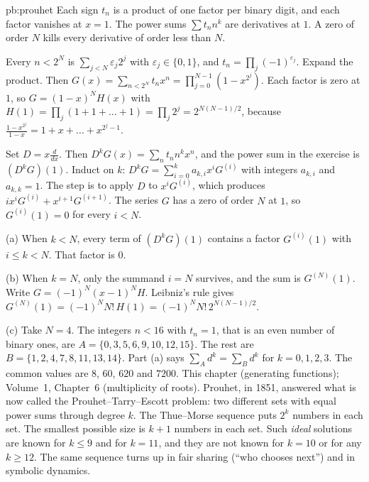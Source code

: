 \begin{solution}{pb:prouhet}
\idea Each sign $t_n$ is a product of one factor per binary digit, and each factor vanishes at $x=1$. The power sums $\sum t_nn^k$ are derivatives at $1$. A zero of order $N$ kills every
derivative of order less than $N$.

\writeup Every $n<2^N$ is $\sum_{j<N}\varepsilon_j2^j$ with $\varepsilon_j\in\{0,1\}$, and $t_n=\prod_j(-1)^{\varepsilon_j}$. Expand
the product. Then $G(x)=\sum_{n<2^N}t_nx^n=\prod_{j=0}^{N-1}(1-x^{2^j})$. Each factor is zero at $1$, so $G=(1-x)^NH(x)$ with
$H(1)=\prod_j(1+1+\dots+1)=\prod_j2^j=2^{N(N-1)/2}$, because $\frac{1-x^{2^j}}{1-x}=1+x+\dots+x^{2^j-1}$.

Set $D=x\frac d{dx}$. Then $D^kG(x)=\sum_nt_nn^kx^n$, and the power sum in the exercise is $(D^kG)(1)$. Induct on $k$:
$D^kG=\sum_{i=0}^ka_{k,i}x^iG^{(i)}$ with integers $a_{k,i}$ and $a_{k,k}=1$. The step is to apply $D$ to $x^iG^{(i)}$, which produces
$ix^iG^{(i)}+x^{i+1}G^{(i+1)}$. The series $G$ has a zero of order $N$ at $1$, so $G^{(i)}(1)=0$ for every $i<N$.

(a) When $k<N$, every term of $(D^kG)(1)$ contains a factor $G^{(i)}(1)$ with $i\le k<N$. That factor is $0$.

(b) When $k=N$, only the summand $i=N$ survives, and the sum is $G^{(N)}(1)$. Write $G=(-1)^N(x-1)^NH$. Leibniz's rule gives
$G^{(N)}(1)=(-1)^NN!\,H(1)=(-1)^NN!\,2^{N(N-1)/2}$.

(c) Take $N=4$. The integers $n<16$ with $t_n=1$, that is an even number of binary ones, are
$A=\{0,3,5,6,9,10,12,15\}$. The rest are $B=\{1,2,4,7,8,11,13,14\}$. Part (a) says $\sum_Ad^k=\sum_Bd^k$ for $k=0,1,2,3$.
The common values are $8$, $60$, $620$ and $7200$.
\tools This chapter (generating functions); Volume~1, Chapter~6 (multiplicity of roots).
\leads Prouhet, in 1851, answered what is now called the Prouhet--Tarry--Escott problem: two different sets
with equal power sums through degree $k$. The Thue--Morse sequence puts $2^{k}$ numbers in each set. The smallest possible size is
$k+1$ numbers in each set. Such \emph{ideal} solutions are known for $k\le9$ and for $k=11$, and they are not known for $k=10$ or for any $k\ge12$. The same sequence turns up in fair sharing (``who chooses next'')
and in symbolic dynamics.
\end{solution}

